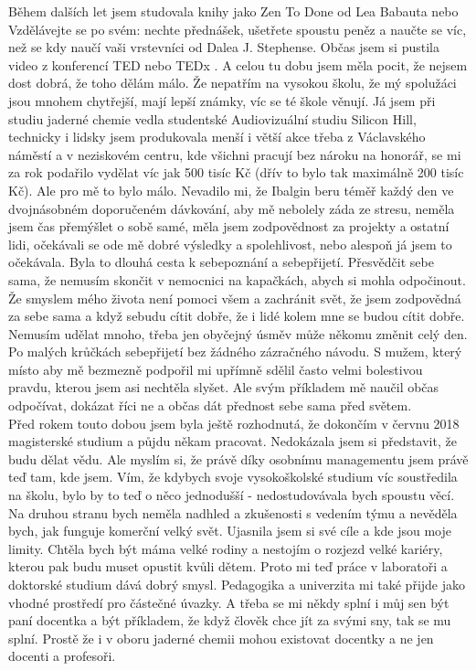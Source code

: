 \documentclass[a4paper]{scrartcl}
\begin{document}
\indent Během dalších let jsem studovala knihy jako Zen To Done \cite{babauta2009} od Lea Babauta nebo Vzdělávejte se po svém: nechte přednášek, ušetřete spoustu 
peněz a naučte se víc, než se kdy naučí vaši vrstevníci \cite{stephens2013} od Dalea J. Stephense. Občas jsem si pustila video z konferencí TED nebo TEDx 
\cite{ted}. A celou tu dobu jsem měla pocit, že nejsem dost dobrá, že toho dělám málo. Že nepatřím na vysokou školu, že mý spolužáci jsou mnohem chytřejší, mají 
lepší známky, víc se té škole věnují. Já jsem při studiu jaderné chemie vedla studentské Audiovizuální studiu Silicon Hill, technicky i lidsky jsem produkovala 
menší i větší akce třeba z Václavského náměstí a v neziskovém centru, kde všichni pracují bez nároku na honorář, se mi za rok podařilo vydělat víc jak 500 tisíc 
Kč (dřív to bylo tak maximálně 200 tisíc Kč). Ale pro mě to bylo málo. Nevadilo mi, že Ibalgin beru téměř každý den ve dvojnásobném doporučeném dávkování, aby mě
nebolely záda ze stresu, neměla jsem čas přemýšlet o sobě samé, měla jsem zodpovědnost za projekty a ostatní lidi, očekávali se ode mě dobré výsledky a 
spolehlivost, nebo alespoň já jsem to očekávala. Byla to dlouhá cesta k sebepoznání a sebepřijetí. Přesvědčit sebe sama, že nemusím skončit v nemocnici na 
kapačkách, abych si mohla odpočinout. Že smyslem mého života není pomoci všem a zachránit svět, že jsem zodpovědná za sebe sama a když sebudu cítit dobře, že i 
lidé kolem mne se budou cítit dobře. Nemusím udělat mnoho, třeba jen obyčejný úsměv může někomu změnit celý den. Po malých krůčkách sebepřijetí bez žádného 
zázračného návodu. S mužem, který místo aby mě bezmezně podpořil mi upřímně sdělil často velmi bolestivou pravdu, kterou jsem asi nechtěla slyšet. Ale svým 
příkladem mě naučil občas odpočívat, dokázat říci ne a občas dát přednost sebe sama před světem. \\

\indent Před rokem touto dobou jsem byla ještě rozhodnutá, že dokončím v červnu 2018 magisterské studium a půjdu někam pracovat. Nedokázala jsem si představit, 
že budu dělat vědu. Ale myslím si, že právě díky osobnímu managementu jsem právě teď tam, kde jsem. Vím, že kdybych svoje vysokoškolské studium víc soustředila 
na školu, bylo by to teď o něco jednodušší - nedostudovávala bych spoustu věcí. Na druhou stranu bych neměla nadhled a zkušenosti s vedením týmu a nevěděla bych, 
jak funguje komerční velký svět. Ujasnila jsem si své cíle a kde jsou moje limity. Chtěla bych být máma velké rodiny a nestojím o rozjezd velké kariéry, kterou 
pak budu muset opustit kvůli dětem. Proto mi teď práce v laboratoři a doktorské studium dává dobrý smysl. Pedagogika a univerzita mi také přijde jako vhodné 
prostředí pro částečné úvazky. A třeba se mi někdy splní i můj sen být paní docentka a být příkladem, že když člověk chce jít za svými sny, tak se mu splní. 
Prostě že i v oboru jaderné chemii mohou existovat docentky a ne jen docenti a profesoři.\\
\end{document}
